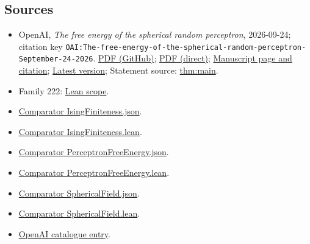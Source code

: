\documentclass[11pt]{article}
\begin{document}
\subsection{Sources}
\begin{itemize}
\item OpenAI, \emph{The free energy of the spherical random perceptron}, 2026-09-24; citation key \texttt{OAI:The-free-energy-of-the-spherical-random-perceptron-September-24-2026}. \href{https://github.com/openai/math/blob/adc7f1241b42e322a6451854ab7e4b4c146bf78a/preprints/The-free-energy-of-the-spherical-random-perceptron-September-24-2026/The-free-energy-of-the-spherical-random-perceptron-September-24-2026.pdf}{PDF (GitHub)}; \href{https://github.com/openai/math/raw/adc7f1241b42e322a6451854ab7e4b4c146bf78a/preprints/The-free-energy-of-the-spherical-random-perceptron-September-24-2026/The-free-energy-of-the-spherical-random-perceptron-September-24-2026.pdf}{PDF (direct)}; \href{https://github.com/openai/math/blob/adc7f1241b42e322a6451854ab7e4b4c146bf78a/preprints/The-free-energy-of-the-spherical-random-perceptron-September-24-2026/README.md}{Manuscript page and citation}; \href{https://github.com/openai/math/blob/main/preprints/The-free-energy-of-the-spherical-random-perceptron-September-24-2026/The-free-energy-of-the-spherical-random-perceptron-September-24-2026.pdf}{Latest version}; Statement source: \href{https://github.com/openai/math/blob/adc7f1241b42e322a6451854ab7e4b4c146bf78a/preprints/The-free-energy-of-the-spherical-random-perceptron-September-24-2026/build/paper.tex\#L72}{thm:main}.
\item Family 222: \href{https://github.com/openai/math/blob/adc7f1241b42e322a6451854ab7e4b4c146bf78a/lean/docs/222.md}{Lean scope}.
\item \href{https://github.com/openai/math/blob/adc7f1241b42e322a6451854ab7e4b4c146bf78a/lean/ComparatorChallenges/IsingFiniteness.json}{Comparator IsingFiniteness.json}.
\item \href{https://github.com/openai/math/blob/adc7f1241b42e322a6451854ab7e4b4c146bf78a/lean/ComparatorChallenges/IsingFiniteness.lean}{Comparator IsingFiniteness.lean}.
\item \href{https://github.com/openai/math/blob/adc7f1241b42e322a6451854ab7e4b4c146bf78a/lean/ComparatorChallenges/PerceptronFreeEnergy.json}{Comparator PerceptronFreeEnergy.json}.
\item \href{https://github.com/openai/math/blob/adc7f1241b42e322a6451854ab7e4b4c146bf78a/lean/ComparatorChallenges/PerceptronFreeEnergy.lean}{Comparator PerceptronFreeEnergy.lean}.
\item \href{https://github.com/openai/math/blob/adc7f1241b42e322a6451854ab7e4b4c146bf78a/lean/ComparatorChallenges/SphericalField.json}{Comparator SphericalField.json}.
\item \href{https://github.com/openai/math/blob/adc7f1241b42e322a6451854ab7e4b4c146bf78a/lean/ComparatorChallenges/SphericalField.lean}{Comparator SphericalField.lean}.
\item \href{https://github.com/openai/math/blob/adc7f1241b42e322a6451854ab7e4b4c146bf78a/CONTENTS.md}{OpenAI catalogue entry}.
\end{itemize}
\end{document}
